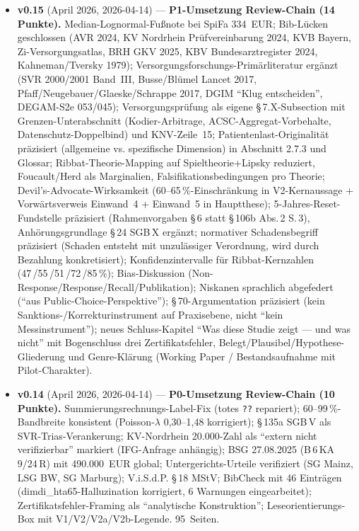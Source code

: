 \documentclass{umbruch-position}
\begin{document}
{\begin{itemize}[leftmargin=3em, itemsep=0.5em]
  \item \textbf{v0.15} (April 2026, 2026-04-14) --- \textbf{P1-Umsetzung Review-Chain (14 Punkte).} Median-Lognormal-Fußnote bei SpiFa 334~EUR; Bib-Lücken geschlossen (AVR 2024, KV Nordrhein Prüfvereinbarung 2024, KVB Bayern, Zi-Versorgungsatlas, BRH GKV 2025, KBV Bundesarztregister 2024, Kahneman/Tversky 1979); Versorgungsforschungs-Primärliteratur ergänzt (SVR 2000/2001 Band~III, Busse/Blümel Lancet 2017, Pfaff/Neugebauer/Glaeske/Schrappe 2017, DGIM ``Klug entscheiden'', DEGAM-S2e 053/045); Versorgungsprüfung als eigene \S\,7.X-Subsection mit Grenzen-Unterabschnitt (Kodier-Arbitrage, ACSC-Aggregat-Vorbehalte, Datenschutz-Doppelbind) und KNV-Zeile~15; Patientenlast-Originalität präzisiert (allgemeine vs. spezifische Dimension) in Abschnitt 2.7.3 und Glossar; Ribbat-Theorie-Mapping auf Spieltheorie+Lipsky reduziert, Foucault/Herd als Marginalien, Falsifikationsbedingungen pro Theorie; Devil's-Advocate-Wirksamkeit (60--65\,\%-Einschränkung in V2-Kernaussage + Vorwärtsverweis Einwand~4 + Einwand~5 in Hauptthese); 5-Jahres-Reset-Fundstelle präzisiert (Rahmenvorgaben \S\,6 statt \S\,106b Abs.\,2 S.\,3), Anhörungsgrundlage \S\,24 SGB\,X ergänzt; normativer Schadensbegriff präzisiert (Schaden entsteht mit unzulässiger Verordnung, wird durch Bezahlung konkretisiert); Konfidenzintervalle für Ribbat-Kernzahlen (47\,/55\,/51\,/72\,/85\,\%); Bias-Diskussion (Non-Response/Response/Recall/Publikation); Niskanen sprachlich abgefedert (``aus Public-Choice-Perspektive''); \S\,70-Argumentation präzisiert (kein Sanktions-/Korrekturinstrument auf Praxisebene, nicht ``kein Messinstrument''); neues Schluss-Kapitel ``Was diese Studie zeigt --- und was nicht'' mit Bogenschluss drei Zertifikatsfehler, Belegt/Plausibel/Hypothese-Gliederung und Genre-Klärung (Working Paper / Bestandsaufnahme mit Pilot-Charakter).

  \item \textbf{v0.14} (April 2026, 2026-04-14) --- \textbf{P0-Umsetzung Review-Chain (10 Punkte).} Summierungsrechnungs-Label-Fix (totes \texttt{??} repariert); 60--99\,\%-Bandbreite konsistent (Poisson-$\lambda$ 0,30--1,48 korrigiert); \S\,135a SGB\,V als SVR-Trias-Verankerung; KV-Nordrhein 20.000-Zahl als ``extern nicht verifizierbar'' markiert (IFG-Anfrage anhängig); BSG 27.08.2025 (B\,6\,KA\,9/24\,R) mit 490.000~EUR global; Untergerichts-Urteile verifiziert (SG Mainz, LSG BW, SG Marburg); V.i.S.d.P. \S\,18 MStV; BibCheck mit 46 Einträgen (dimdi\_hta65-Halluzination korrigiert, 6 Warnungen eingearbeitet); Zertifikatsfehler-Framing als ``analytische Konstruktion''; Leseorientierungs-Box mit V1/V2/V2a/V2b-Legende. 95~Seiten.


\end{itemize}}
\end{document}
